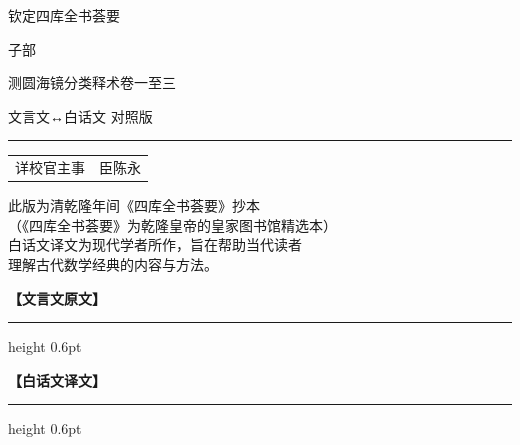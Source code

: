 \documentclass[11pt,a4paper]{article}
\newcommand{\shortline}{\noindent\rule{0.5\textwidth}{0.4pt}\par}
\newcommand{\colheaders}{%
  \noindent\begin{minipage}[t]{0.48\textwidth}\centering
    \textbf{\color{classicalframe}【文言文原文】}
    \vspace{0.3em}
    \hrule height 0.6pt
  \end{minipage}%
  \hfill
  \begin{minipage}[t]{0.48\textwidth}\centering
    \textbf{\color{modernframe}【白话文译文】}
    \vspace{0.3em}
    \hrule height 0.6pt
  \end{minipage}
  \par\medskip
}
\begin{document}
\thispagestyle{empty}
\begin{center}
\vspace*{2.5cm}
{\LARGE 钦定四库全书荟要}

\vspace{1.2cm}
{\Large 子部}

\vspace{1.5cm}
{\Large 测圆海镜分类释术卷一至三}

\vspace{0.5cm}
{\normalsize\color{notecolor} 文言文↔白话文 对照版}

\vspace{1.5cm}
\shortline

\vspace{1cm}
{\normalsize
\begin{tabular}{ll}
详校官主事 & 臣陈永 \\
\end{tabular}
}

\vspace{2.5cm}
{\small\textcolor{notecolor}{%
此版为清乾隆年间《四库全书荟要》抄本\\
（《四库全书荟要》为乾隆皇帝的皇家图书馆精选本）\\[0.5em]
白话文译文为现代学者所作，旨在帮助当代读者\\
理解古代数学经典的内容与方法。
}}

\end{center}
\clearpage

\tableofcontents
\clearpage

\colheaders
\end{document}
